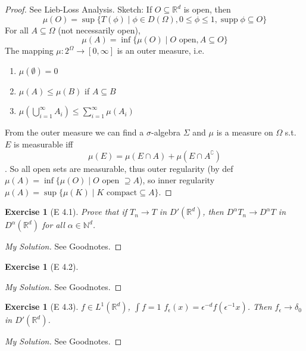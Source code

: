 \documentclass{report}
\theoremstyle{tommy}
\newtheorem{ex}[defn]{Exercise}
\newcommand{\supp}{\operatorname{supp}}
\begin{document}
  \begin{proof}See Lieb-Loss Analysis. Sketch: If \(O \subseteq \mathbb{R}^d\) is open, then 
    \[\mu(O) = \sup \{T(\phi) \mid \phi \in D(\Omega), 0 \le \phi \le 1, \supp \phi \subseteq O\}\]
    For all \(A \subseteq \Omega\) (not necessarily open),
    \[\mu(A) = \inf \{\mu(O) \mid O \text{ open}, A \subseteq O\}\]
    The mapping \(\mu: 2^\Omega \to [0, \infty]\) is an outer measure, i.e.
    \begin{enumerate}
      \item \(\mu(\emptyset) = 0\)
      \item \(\mu(A) \le \mu(B)\) if \(A \subseteq B\)
      \item \(\mu \left(\bigcup_{i=1}^\infty A_i\right) \le \sum_{i=1}^\infty \mu(A_i)\)
    \end{enumerate}
    From the outer measure we can find a \(\sigma\)-algebra \(\Sigma\) and \(\mu\) is a measure on \(\Omega\) s.t. \(E\) is measurable iff \[\mu(E) = \mu(E \cap A) + \mu(E \cap A^\complement)\].
    So all open sets are measurable, thus outer regularity (by def \(\mu(A) = \inf\{\mu(O) \mid O \text{ open } \supseteq A\)), so inner regularity \(\mu(A) = \sup\{\mu(K) \mid K \text{ compact} \subseteq A\}\). 
  \end{proof}


  \begin{ex}[E 4.1]
    Prove that if \(T_n \to T\) in \(D'(\mathbb{R}^d)\), then \(D^\alpha T_n  \to D^\alpha T\) in \(D^\alpha(\mathbb{R}^d)\) for all \(\alpha \in \mathbb{N}^d\).
  \end{ex}

  \begin{proof}[My Solution]
    See Goodnotes.
  \end{proof}

  \begin{ex}[E 4.2]
    
  \end{ex}

  \begin{proof}[My Solution]
    See Goodnotes.
  \end{proof}

  \begin{ex}[E 4.3]
    \(f \in L^1(\mathbb{R}^d)\), \(\int f = 1\) \(f_\epsilon(x) = \epsilon^{-d} f(\epsilon^{-1}x)\). Then \(f_\epsilon \to \delta_0\) in \(D'(\mathbb{R}^d)\). 
  \end{ex}

  \begin{proof}[My Solution]
    See Goodnotes.
  \end{proof}
\end{document}
